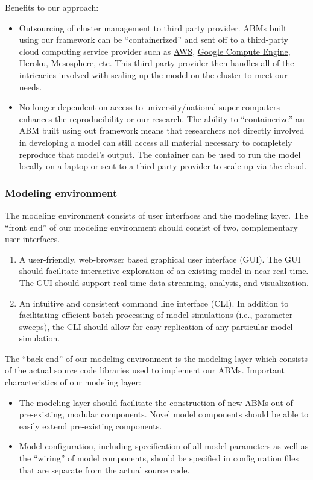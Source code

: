 \documentclass[11pt]{amsart}
\begin{document}
Benefits to our approach:
\begin{itemize}
    \item Outsourcing of cluster management to third party provider. ABMs built using our framework can be ``containerized'' and sent off to a third-party cloud computing service provider such as \href{http://aws.amazon.com/}{AWS}, \href{https://cloud.google.com/compute/}{Google Compute Engine}, \href{https://www.heroku.com/}{Heroku}, \href{https://mesosphere.com/}{Mesosphere}, etc. This third party provider then handles all of the intricacies involved with scaling up the model on the cluster to meet our needs.
    \item No longer dependent on access to university/national super-computers enhances the reproducibility or our research.  The ability to ``containerize'' an ABM built using out framework means that researchers not directly involved in developing a model can still access all material necessary to completely reproduce that model's output. The container can be used to run the model locally on a laptop or sent to a third party provider to scale up via the cloud. 
\end{itemize}

\subsubsection{Modeling environment}
The modeling environment consists of user interfaces and the modeling layer. The ``front end'' of our modeling environment should consist of two, complementary user interfaces.
\begin{enumerate}
    \item A user-friendly, web-browser based graphical user interface (GUI). The GUI should facilitate interactive exploration of an existing model in near real-time.  The GUI should support real-time data streaming, analysis, and visualization.
    \item An intuitive and consistent command line interface (CLI). In addition to facilitating efficient batch processing of model simulations (i.e., parameter sweeps), the CLI should allow for easy replication of any particular model simulation.
\end{enumerate}

The ``back end'' of our modeling environment is the modeling layer which consists of the actual source code libraries used to implement our ABMs. Important characteristics of our modeling layer:  

\begin{itemize}
    \item The modeling layer should facilitate the construction of new ABMs out of pre-existing, modular components. Novel model components should be able to easily extend pre-existing components. 
    \item Model configuration, including specification of all model parameters as well as the ``wiring'' of model components, should be specified in configuration files that are separate from the actual source code.
\end{itemize}
\end{document}
